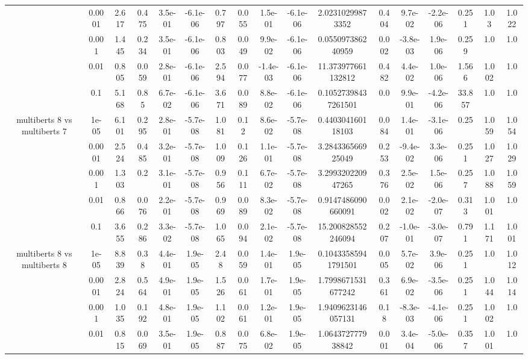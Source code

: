 \begin{tabular}{|c|c|c|c|c|c|c|c|c|c|c|c|c|c|c|c|c|}
 & 0.0001 & 2.617 & 0.475 & 3.5e-01 & -6.1e-06 & 0.797 & 0.055 & 1.5e-01 & -6.1e-06 & 2.02310299873352 & 0.404 & 9.7e-02 & -2.2e-06 & 0.251 & 1.03 & 1.022 \\
 & 0.001 & 1.445 & 0.234 & 3.5e-01 & -6.1e-06 & 0.803 & 0.049 & 9.9e-02 & -6.1e-06 & 0.055097386240959 & 0.002 & -3.8e-03 & 1.9e-06 & 0.259 & 1.0 & 1.0 \\
 & 0.01 & 0.805 & 0.059 & 2.8e-01 & -6.1e-06 & 2.594 & 0.077 & -1.4e-03 & -6.1e-06 & 11.373977661132812 & 0.482 & 4.4e-02 & 1.0e-06 & 1.566 & 1.002 & 1.0 \\
 & 0.1 & 5.168 & 0.85 & 6.7e-02 & -6.1e-06 & 3.671 & 0.089 & 8.8e-02 & -6.1e-06 & 0.10527398437261501 & 0.0 & 9.9e-01 & -4.2e-06 & 33.857 & 1.0 & 1.0 \\
\hline
\multirow{5}{*}{multiberts 8 vs multiberts 7} & 1e-05 & 6.101 & 0.295 & 2.8e-01 & -5.7e-08 & 1.081 & 0.12 & 8.6e-02 & -5.7e-08 & 0.440304160118103 & 0.084 & 1.4e-01 & -3.1e-06 & 0.25 & 1.059 & 1.054 \\
 & 0.0001 & 2.524 & 0.485 & 3.2e-01 & -5.7e-08 & 1.009 & 0.126 & 1.1e-01 & -5.7e-08 & 3.284336566925049 & 0.253 & -9.4e-02 & 3.3e-06 & 0.251 & 1.027 & 1.029 \\
 & 0.001 & 1.303 & 0.2 & 3.1e-01 & -5.7e-08 & 0.956 & 0.111 & 6.7e-02 & -5.7e-08 & 3.299320220947265 & 0.376 & 2.5e-02 & 1.5e-06 & 0.257 & 1.088 & 1.059 \\
 & 0.01 & 0.866 & 0.076 & 2.2e-01 & -5.7e-08 & 0.969 & 0.089 & 8.3e-02 & -5.7e-08 & 0.9147486090660091 & 0.002 & 2.1e-02 & -2.0e-07 & 0.313 & 1.001 & 1.0 \\
 & 0.1 & 3.655 & 0.286 & 3.3e-02 & -5.7e-08 & 1.065 & 0.094 & 2.1e-02 & -5.7e-08 & 15.200828552246094 & 0.207 & -1.0e-01 & -3.0e-07 & 0.791 & 1.171 & 1.001 \\
\hline
\multirow{5}{*}{multiberts 8 vs multiberts 8} & 1e-05 & 8.839 & 0.38 & 4.4e-01 & 1.9e-05 & 2.48 & 0.059 & 1.4e-01 & 1.9e-05 & 0.10433585941791501 & 0.005 & 5.7e-02 & 3.9e-06 & 0.251 & 1.0 & 1.012 \\
 & 0.0001 & 2.824 & 0.564 & 4.9e-01 & 1.9e-05 & 1.526 & 0.061 & 1.7e-01 & 1.9e-05 & 1.7998671531677242 & 0.361 & 6.9e-02 & -3.5e-06 & 0.251 & 1.044 & 1.014 \\
 & 0.001 & 1.035 & 0.192 & 4.8e-01 & 1.9e-05 & 1.102 & 0.061 & 1.2e-01 & 1.9e-05 & 1.9409623146057131 & 0.18 & -8.3e-03 & -4.1e-06 & 0.251 & 1.002 & 1.0 \\
 & 0.01 & 0.815 & 0.069 & 3.5e-01 & 1.9e-05 & 0.887 & 0.075 & 6.8e-02 & 1.9e-05 & 1.064372777938842 & 0.001 & 3.4e-04 & -5.0e-06 & 0.357 & 1.001 & 1.0 \\

\end{tabular}
